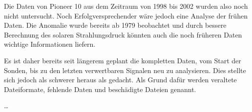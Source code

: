 Die Daten von Pioneer 10 aus dem Zeitraum von 1998 bis 2002 wurden also noch nicht untersucht. Noch
Erfolgversprechender wäre jedoch eine Analyse der frühen Daten. Die Anomalie wurde bereits ab 1979 beobachtet und durch
bessere Berechnung des solaren Strahlungsdruck könnten auch die noch früheren Daten wichtige Informationen liefern.

Es ist daher bereits seit längerem geplant die kompletten Daten, vom Start der Sonden, bis zu den letzten verwertbaren Signalen neu zu analysieren. Dies stellte sich jedoch als schwerer heraus als gedacht. Als Grund dafür werden veraltete Dateiformate, fehlende Daten und beschädigte Dateien genannt.\cite{Turyshev2010}



\bigskip
…
\bigskip

